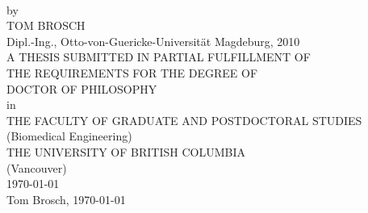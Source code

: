 \begin{titlepage}
\newlength{\smalltitlespace}
\newlength{\mediumtitlespace}
\newlength{\largetitlespace}
\setlength{\smalltitlespace}{1em}
\setlength{\mediumtitlespace}{1.5em}
\setlength{\largetitlespace}{3.5em}
\noindent
  \begin{center}
  \mbox{}\vfill
  \large\sffamily
  {\Large\bfseries\MakeUppercase{\longtitle}\\}\vspace{2em}
  by\\[1.5em]
  {\large TOM BROSCH\\[\smalltitlespace]}
  {\large Dipl.-Ing., Otto-von-Guericke-Universit\"at Magdeburg,
  2010\\[\largetitlespace]}
  {\large A THESIS SUBMITTED IN PARTIAL
  FULFILLMENT OF\\
  THE REQUIREMENTS FOR THE DEGREE OF\\[\smalltitlespace]
  DOCTOR OF PHILOSOPHY\\[\smalltitlespace]}
  in\\[\smalltitlespace]
  {\large THE FACULTY OF GRADUATE AND POSTDOCTORAL STUDIES\\[\smalltitlespace]
  (Biomedical Engineering)\\[\largetitlespace]}
  {\large THE UNIVERSITY OF BRITISH COLUMBIA\\[\smalltitlespace]
  (Vancouver)\\[\largetitlespace]}
  \thesisdate\today\\[\smalltitlespace]
  {\rmfamily \textcopyright{}} Tom Brosch, \thesisyear\today
  \end{center}
\end{titlepage}

